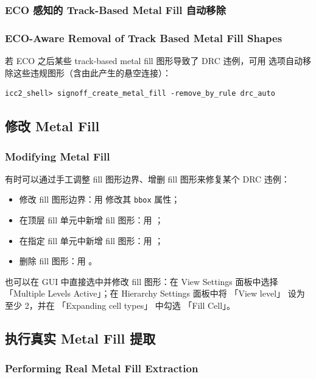 \subsubsection{ECO 感知的 Track-Based Metal Fill 自动移除}
\subsubsection*{ECO-Aware Removal of Track Based Metal Fill Shapes}

若 ECO 之后某些 track-based metal fill 图形导致了 DRC 违例，可用  选项自动移除这些违规图形（含由此产生的悬空连接）：

\begin{lstlisting}
icc2_shell> signoff_create_metal_fill -remove_by_rule drc_auto
\end{lstlisting}

\subsection{修改 Metal Fill}
\subsubsection*{Modifying Metal Fill}

有时可以通过手工调整 fill 图形边界、增删 fill 图形来修复某个 DRC 违例：
\begin{itemize}
  \item 修改 fill 图形边界：用  修改其 \texttt{bbox} 属性；
  \item 在顶层 fill 单元中新增 fill 图形：用 ；
  \item 在指定 fill 单元中新增 fill 图形：用 ；
  \item 删除 fill 图形：用 。
\end{itemize}

也可以在 GUI 中直接选中并修改 fill 图形：在 View Settings 面板中选择 「Multiple Levels Active」；在 Hierarchy Settings 面板中将 「View level」 设为至少 2，并在 「Expanding cell types」 中勾选 「Fill Cell」。

\subsection{执行真实 Metal Fill 提取}
\subsubsection*{Performing Real Metal Fill Extraction}


